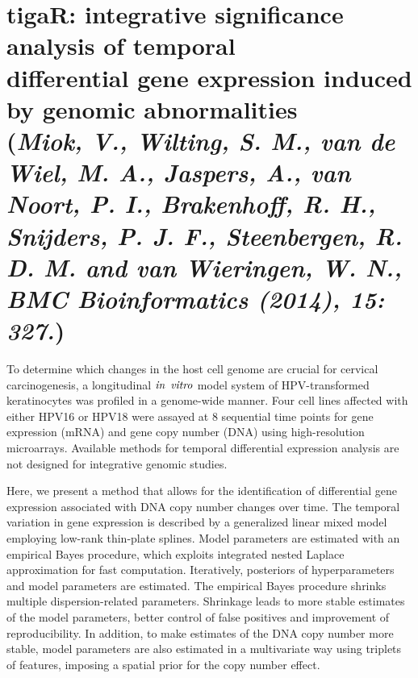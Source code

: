 \chapter{tigaR: integrative significance analysis of temporal \\differential gene expression induced by genomic abnormalities \\ {\footnotesize (\textit{Miok, V., Wilting, S. M., van de Wiel, M. A., Jaspers, A., van Noort, P. I., Brakenhoff, R. H., Snijders, P. J. F., Steenbergen, R. D. M. and van Wieringen, W. N., BMC Bioinformatics (2014), 15: 327.})}}
\graphicspath{{Chapter2/Figs/}{Chapter2/Figs/PDF/}{Chapter2/Figs/}}%



To determine which changes in the host cell genome are crucial for cervical carcinogenesis, a longitudinal $\it{in}$ $\it{vitro}$ model system of HPV-transformed keratinocytes was profiled in a genome-wide manner. Four cell lines affected with either HPV16 or HPV18 were assayed at 8 sequential time points for gene expression (mRNA) and gene copy number (DNA) using high-resolution microarrays. Available methods for temporal differential expression analysis are not designed for integrative genomic studies.

Here, we present a method that allows for the identification of differential gene expression associated with DNA copy number changes over time. The temporal variation in gene expression is described by a generalized linear mixed model employing low-rank thin-plate splines. Model parameters are estimated with an empirical Bayes procedure, which exploits integrated nested Laplace approximation for fast computation. Iteratively, posteriors of hyperparameters and model parameters are estimated. The empirical Bayes procedure shrinks multiple dispersion-related parameters. Shrinkage leads to more stable estimates of the model parameters, better control of false positives and improvement of reproducibility. In addition, to make estimates of the DNA copy number more stable, model parameters are also estimated in a multivariate way using triplets of features, imposing a spatial prior for the copy number effect.

